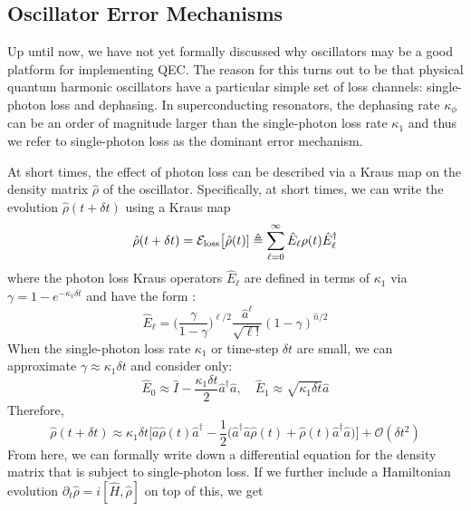 \subsection{Oscillator Error Mechanisms}

Up until now, we have not yet formally discussed why oscillators may be a good platform for implementing QEC. The reason for this turns out to be that physical quantum harmonic oscillators have a particular simple set of loss channels: single-photon loss and dephasing. In superconducting resonators, the dephasing rate $\kappa_\phi$ can be an order of magnitude larger than the single-photon loss rate $\kappa_1$ and thus we refer to single-photon loss as the dominant error mechanism. 

At short times, the effect of photon loss can be described via a Kraus map on the density matrix $\hat{\rho}$ of the oscillator. Specifically, at short times, we can write the evolution $\hat{\rho}(t + \delta t)$ using a Kraus map
\begin{equation}
    \hat{\rho}(t + \delta t) = \mathcal{E}_{\rm loss}\big[\hat{\rho}(t)] \triangleq \sum_{\ell = 0}^\infty  \hat{E}_\ell \rho(t)  \hat{E}_\ell^\dagger
\end{equation}
where the photon loss Kraus operators $ \hat{E}_\ell$ are defined in terms of $\kappa_1$ via $\gamma = 1 - e^{-\kappa_1 \delta t}$ and have the form \cite{albert2018performance-and-structure}:
\begin{equation}
    \hat{E}_\ell = \bigg(\frac{\gamma}{1 - \gamma}\bigg)^{\ell/2} \frac{\hat{a}^\ell}{\sqrt{\ell !}} (1 - \gamma)^{\hat{n}/2}
\end{equation}
When the single-photon loss rate $\kappa_1$ or time-step $\delta t$ are small, we can approximate $\gamma \approx \kappa_1 \delta t$ and consider only:
\begin{equation}
    \hat{E}_0 \approx \hat{I} - \frac{\kappa_1 \delta t}{2}\hat{a}^\dagger\hat{a}, \quad \hat{E}_1 \approx \sqrt{\kappa_1 \delta t}\hat{a}
\end{equation}
Therefore, 
\begin{equation}
    \hat{\rho}(t + \delta t) \approx \kappa_1\delta t\bigg[\hat{a}\hat{\rho}(t)\hat{a}^\dagger - \frac{1}{2}\Big(\hat{a}^\dagger\hat{a}\hat{\rho}(t) + \hat{\rho}(t)\hat{a}^\dagger\hat{a}\Big)\bigg] + \mathcal{O}(\delta t^2)
\end{equation}
From here, we can formally write down a differential equation for the density matrix that is subject to single-photon loss. If we further include a Hamiltonian evolution $\partial_t \hat{\rho} = i[\hat{H}, \hat{\rho}]$ on top of this, we get
